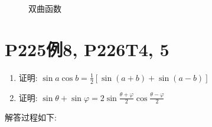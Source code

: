 \documentclass{book}
\begin{document}
    \begin{figure}[htbp]    %
          \centering            %
          \caption{双曲函数}    %
          \label{fig:subfig_1}            %
        \end{figure}
    \section{\textcolor[rgb]{0.11,0.65,0.52}{P225例8, P226T4, 5}}
    \begin{boxB}
        \begin{enumerate}
            \item 证明: $\displaystyle \sin a\cos b=\frac{1}{2}[\sin(a+b)+\sin(a-b)]$
            \item 证明: $\displaystyle \sin \theta + \sin \varphi = 2\sin\frac{\theta+\varphi}{2}\cos\frac{\theta-\varphi}{2}$
        \end{enumerate}
    \end{boxB}
    解答过程如下:
\end{document}
